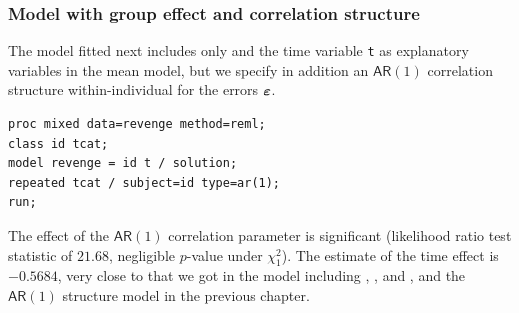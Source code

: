 \documentclass{beamer}
\begin{document}
% 

\begin{frame}[fragile]
\frametitle{Model with group effect and correlation structure}
The model fitted next includes only  and the time variable \texttt{t} as explanatory variables in the mean model, but we specify in addition an $\mathsf{AR}(1)$ correlation structure within-individual for the errors $\boldsymbol {\varepsilon}$.

\begin{tcolorbox}[colback=white, colframe=hecblue, title=\SASlang{} code to include a group effect with $\mathsf{AR}(1)$ correlation]
\begin{verbatim}
proc mixed data=revenge method=reml; 
class id tcat; 
model revenge = id t / solution; 
repeated tcat / subject=id type=ar(1); 
run;
\end{verbatim}
\end{tcolorbox}
{\footnotesize  The effect of the $\mathsf{AR}(1)$ correlation parameter is significant (likelihood ratio test statistic of $21.68$, negligible $p$-value under $\chi^2_1$). The estimate of the time effect is $-0.5684$, very close to that we got in the model including , ,  and , and the  $\mathsf{AR}(1)$ structure model in the previous chapter. 

}
\end{frame}
% 
\end{document}
